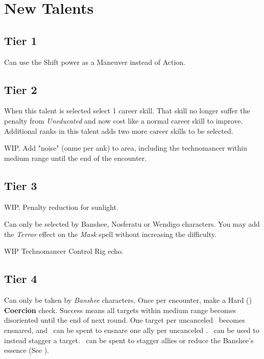 \documentclass{book}
\begin{document}
\chapter{New Talents}
\begin{multicols}{2}
\section{Tier 1}
 Can use the Shift power as a Maneuver instead of Action.


\section{Tier 2}

 When this talent is selected select 1 career skill. That skill no longer suffer the penalty from \textit{Uneducated} and now cost like a normal career skill to improve. Additional ranks in this talent adds two more career skills to be selected.

 WIP. Add "noise" (onme \SetbackDie per ank) to area, including the technomancer within medium range until the end of the encounter.


\section{Tier 3}
 WIP. Penalty reduction for sunlight.

 Can only be selected by Banshee, Nosferatu or Wendigo characters. You may add the \textit{Terror} effect on the \textit{Mask} spell without increasing the difficulty.

 WIP Technomancer Control Rig echo.


\section{Tier 4}
 Can only be taken by \textit{Banshee} characters. Once per encounter, make a Hard (\DifficultyDie \DifficultyDie \DifficultyDie) \textbf{Coercion} check. Success means all targets within medium range becomes disoriented until the end of next round. One target per uncanceled \Success\ becomes ensnared, and \Threat\ can be spent to ensnare one ally per uncanceled \Threat. \Triumph\ can be used to instead stagger a target. \Despair\ can be spent to stagger allies or reduce the Banshee's essence (See \pageref{sec:essenceloss}).


\end{multicols}
\end{document}
